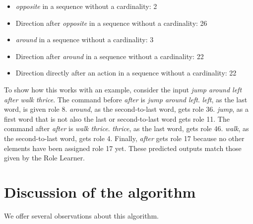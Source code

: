 \begin{itemize}
\begin{itemize}
        \item \textit{opposite} in a sequence without a cardinality: 2
        \item Direction after \textit{opposite} in a sequence without a cardinality: 26
        \item \textit{around} in a sequence without a cardinality: 3
        \item Direction after \textit{around} in a sequence without a cardinality: 22
        \item Direction directly after an action in a sequence without a cardinality: 22
    \end{itemize}
\end{itemize}

\noindent
To show how this works with an example, consider the input \textit{jump around left after walk thrice}. The command before \textit{after} is \textit{jump around left}. \textit{left}, as the last word, is given role 8. \textit{around}, as the second-to-last word, gets role 36. \textit{jump}, as a first word that is not also the last or second-to-last word gets role 11. The command after \textit{after} is \textit{walk thrice}. \textit{thrice}, as the last word, gets role 46. \textit{walk}, as the second-to-last word, gets role 4. Finally, \textit{after} gets role 17 because no other elements have been assigned role 17 yet. These predicted outputs match those given by the Role Learner.

\section{Discussion of the algorithm} \label{sec:rldn-AlgDisc}

We offer several observations about this algorithm.

